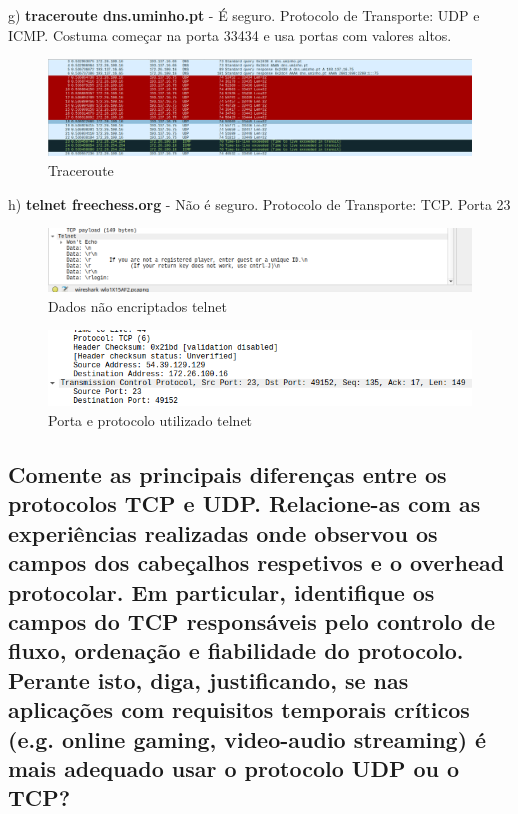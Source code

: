 \documentclass{article}
\begin{document}
g) \textbf{traceroute dns.uminho.pt} - É seguro. Protocolo de Transporte: UDP e ICMP. Costuma começar na porta 33434 e usa portas com valores altos. 

\begin{figure}[h!]
    \centering
    \includegraphics[width=1\textwidth]{images/traceroute.png}
    \caption{\label{fig:pacote}Traceroute}
\end{figure}

h) \textbf{telnet freechess.org} - Não é seguro. Protocolo de Transporte: TCP. Porta 23

\begin{figure}[h!]
    \centering
    \includegraphics[width=1\textwidth]{images/telnet1.png}
    \caption{Dados não encriptados telnet}
    \label{fig:enter-label}
\end{figure}

\begin{figure}[h!]
    \centering
    \includegraphics[width=1\textwidth]{images/telnet2.png}
    \caption{Porta e protocolo utilizado telnet}
    \label{fig:enter-label}
\end{figure}

\subsection{Comente as principais diferenças entre os protocolos TCP e UDP. Relacione-as com as experiências realizadas
onde observou os campos dos cabeçalhos respetivos e o overhead protocolar. Em particular, identifique os
campos do TCP responsáveis pelo controlo de fluxo, ordenação e fiabilidade do protocolo. Perante isto, diga,
justificando, se nas aplicações com requisitos temporais críticos (e.g. online gaming, video-audio streaming) é
mais adequado usar o protocolo UDP ou o TCP?}
\end{document}

